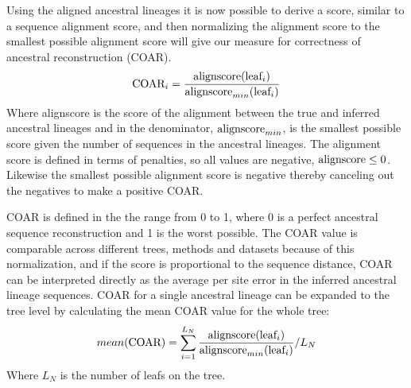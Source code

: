 

Using the aligned ancestral lineages it is now possible to derive a score, similar to a sequence alignment score, and then normalizing the alignment score to the smallest possible alignment score will give our measure for correctness of ancestral reconstruction (COAR).
$$
\text{COAR}_i = \frac{\text{alignscore}(\text{leaf}_i)}{\text{alignscore}_{min}(\text{leaf}_i)}
$$
Where alignscore is the score of the alignment between the true and inferred ancestral lineages and in the denominator, $\text{alignscore}_{min}$, is the smallest possible score given the number of sequences in the ancestral lineages.
The alignment score is defined in terms of penalties, so all values are negative, $\text{alignscore} \leq 0$.
Likewise the smallest possible alignment score is negative thereby canceling out the negatives to make a positive COAR.

COAR is defined in the the range from 0 to 1, where 0 is a perfect ancestral sequence reconstruction and 1 is the worst possible.
The COAR value is comparable across different trees, methods and datasets because of this normalization, and if the score is proportional to the sequence distance, COAR can be interpreted directly as the average per site error in the inferred ancestral lineage sequences.
COAR for a single ancestral lineage can be expanded to the tree level by calculating the mean COAR value for the whole tree:
$$
mean(\text{COAR}) = \sum^{L_N}_{i=1} \frac{\text{alignscore}(\text{leaf}_i)}{\text{alignscore}_{min}(\text{leaf}_i)} / L_N
$$
Where $L_N$ is the number of leafs on the tree.




